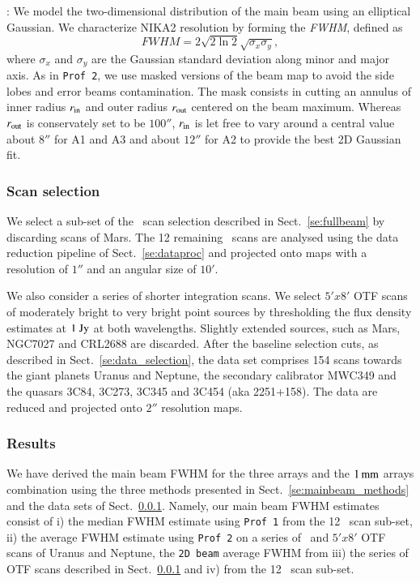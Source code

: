 : We model the two-dimensional distribution of the main
beam using an elliptical Gaussian. We characterize NIKA2 resolution
by forming the \emph{FWHM}, defined as
\begin{equation}
  FWHM = 2 \sqrt{2\ln {2}} \sqrt{\sigma_x\sigma_y},
\end{equation}
where $\sigma_x$ and $\sigma_y$ are the Gaussian standard deviation
along minor and major axis.
As in {\tt Prof 2}, we use masked versions of the
beam map to avoid the side lobes and error beams contamination.
The mask consists in cutting an annulus of inner radius
$r_{\rm{in}}$ and outer radius $r_{\rm{out}}$ centered on the beam
maximum. Whereas $r_{\rm{out}}$ is conservately set to be $100''$,
$r_{\rm{in}}$ is let free to vary around a central value about $8''$
for A1 and A3 and about $12''$ for A2 to provide the best 2D Gaussian
fit.

\subsubsection{Scan selection}
\label{se:mainbeam_dataset}

We select a sub-set of the \bm\ scan selection described in
Sect.~\ref{se:fullbeam} by discarding scans of Mars.
The 12 remaining \bm\ scans are analysed using the data reduction
pipeline of Sect.~\ref{se:dataproc} and projected onto maps
with a resolution of $1''$ and an angular size of $10'$.

We also consider a series of shorter integration scans. We select $5'x8'$ OTF
scans of moderately bright to very bright point sources by
thresholding the flux density estimates at $1~\rm{Jy}$ at both
wavelengths. Slightly extended sources, such as Mars, NGC7027 and
CRL2688 are discarded. After the baseline selection cuts, as described in
Sect.~\ref{se:data_selection}, the data set comprises 154 %
scans
towards the giant planets Uranus and Neptune, the secondary calibrator
MWC349 and the quasars 3C84, 3C273, 3C345 and 3C454 (aka
2251+158). The data are reduced and projected onto $2''$ resolution
maps. 

\subsubsection{Results}
\label{se:mainbeam_results}

We have derived the main beam FWHM for the three arrays and the
$1\,\rm{mm}$ arrays combination using the three methods presented in
Sect.~\ref{se:mainbeam_methods} and the data
sets of Sect.~\ref{se:mainbeam_dataset}. Namely, our main beam FWHM estimates
consist of i) the median FWHM estimate using {\tt Prof 1} from the 12 \bm\ scan
sub-set, ii) the average FWHM estimate using {\tt Prof 2} on a series
of \bm\ and $5'x8'$ OTF scans of Uranus and Neptune, the {\tt 2D beam} average FWHM
from iii) the series of OTF scans described in
Sect.~\ref{se:mainbeam_dataset} and iv) from the 12 \bm\ scan
sub-set.

